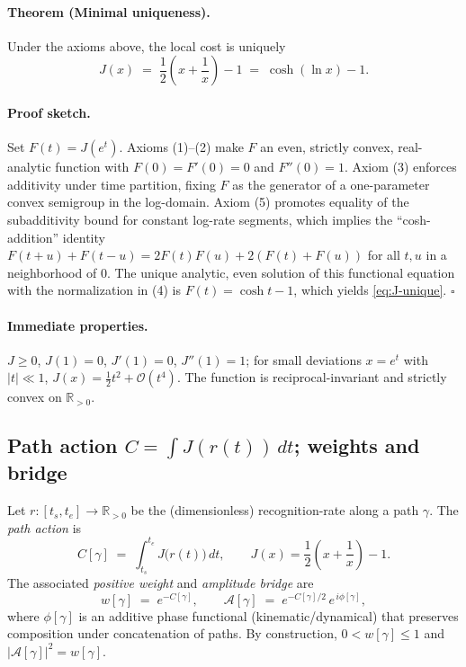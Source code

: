 \documentclass[11pt,letterpaper]{article}
\theoremstyle{definition}
\begin{document}
\paragraph{Theorem (Minimal uniqueness).}
Under the axioms above, the local cost is uniquely
\begin{equation}
J(x)\;=\;\frac12\!\left(x+\frac1x\right)-1 \;=\; \cosh(\ln x)-1.
\label{eq:J-unique}
\end{equation}

\paragraph{Proof sketch.}
Set \(F(t)=J(e^t)\). Axioms (1)--(2) make \(F\) an even, strictly convex, real-analytic function with \(F(0)=F'(0)=0\) and \(F''(0)=1\). Axiom (3) enforces additivity under time partition, fixing \(F\) as the generator of a one-parameter convex semigroup in the log-domain. Axiom (5) promotes equality of the subadditivity bound for constant log-rate segments, which implies the ``cosh-addition'' identity \(F(t+u)+F(t-u)=2F(t)F(u)+2(F(t)+F(u))\) for all \(t,u\) in a neighborhood of \(0\). The unique analytic, even solution of this functional equation with the normalization in (4) is \(F(t)=\cosh t - 1\), which yields \eqref{eq:J-unique}. \hfill\(\square\)

\paragraph{Immediate properties.}
\(J\ge 0\), \(J(1)=0\), \(J'(1)=0\), \(J''(1)=1\); for small deviations \(x=e^t\) with \(|t|\ll 1\), \(J(x)=\tfrac12 t^2+\mathcal O(t^4)\). The function is reciprocal-invariant and strictly convex on \(\mathbb R_{>0}\).

\subsection{Path action \(C=\int J(r(t))\,dt\); weights and bridge}
Let \(r:[t_s,t_e]\to \mathbb R_{>0}\) be the (dimensionless) recognition-rate along a path \(\gamma\). The \emph{path action} is
\begin{equation}
C[\gamma]\;=\;\int_{t_s}^{t_e} J\!\bigl(r(t)\bigr)\,dt,
\qquad
J(x)=\frac12\!\left(x+\frac1x\right)-1.
\label{eq:C-def}
\end{equation}
The associated \emph{positive weight} and \emph{amplitude bridge} are
\begin{equation}
w[\gamma]\;=\;e^{-C[\gamma]},
\qquad
\mathcal A[\gamma]\;=\;e^{-C[\gamma]/2}\,e^{\,i\phi[\gamma]},
\label{eq:bridge}
\end{equation}
where \(\phi[\gamma]\) is an additive phase functional (kinematic/dynamical) that preserves composition under concatenation of paths. By construction, \(0<w[\gamma]\le 1\) and \(|\mathcal A[\gamma]|^2=w[\gamma]\).
\end{document}
